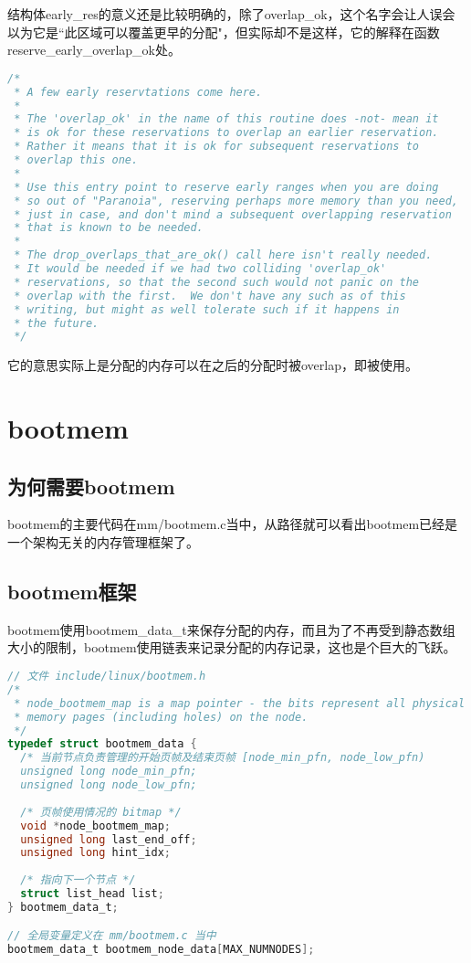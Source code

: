 \documentclass[b5paper,9pt,twoside,openany]{article}
\begin{document}
结构体early\_res的意义还是比较明确的，除了overlap\_ok，这个名字会让人误会以为它是“此区域可以覆盖更早的分配"，但实际却不是这样，它的解释在函数reserve\_early\_overlap\_ok处。
\begin{lstlisting}[language=C]
/*
 * A few early reservtations come here.
 *
 * The 'overlap_ok' in the name of this routine does -not- mean it
 * is ok for these reservations to overlap an earlier reservation.
 * Rather it means that it is ok for subsequent reservations to
 * overlap this one.
 *
 * Use this entry point to reserve early ranges when you are doing
 * so out of "Paranoia", reserving perhaps more memory than you need,
 * just in case, and don't mind a subsequent overlapping reservation
 * that is known to be needed.
 *
 * The drop_overlaps_that_are_ok() call here isn't really needed.
 * It would be needed if we had two colliding 'overlap_ok'
 * reservations, so that the second such would not panic on the
 * overlap with the first.  We don't have any such as of this
 * writing, but might as well tolerate such if it happens in
 * the future.
 */
\end{lstlisting}

它的意思实际上是分配的内存可以在之后的分配时被overlap，即被使用。

\section{bootmem}
\subsection{为何需要bootmem}
bootmem的主要代码在mm/bootmem.c当中，从路径就可以看出bootmem已经是一个架构无关的内存管理框架了。

\subsection{bootmem框架}
bootmem使用bootmem\_data\_t来保存分配的内存，而且为了不再受到静态数组大小的限制，bootmem使用链表来记录分配的内存记录，这也是个巨大的飞跃。
\begin{lstlisting}[language=C]
// 文件 include/linux/bootmem.h
/*
 * node_bootmem_map is a map pointer - the bits represent all physical
 * memory pages (including holes) on the node.
 */
typedef struct bootmem_data {
  /* 当前节点负责管理的开始页帧及结束页帧 [node_min_pfn, node_low_pfn)
  unsigned long node_min_pfn;
  unsigned long node_low_pfn;
  
  /* 页帧使用情况的 bitmap */
  void *node_bootmem_map;
  unsigned long last_end_off;
  unsigned long hint_idx;
 
  /* 指向下一个节点 */
  struct list_head list;
} bootmem_data_t;

// 全局变量定义在 mm/bootmem.c 当中
bootmem_data_t bootmem_node_data[MAX_NUMNODES];
\end{lstlisting}
\end{document}
